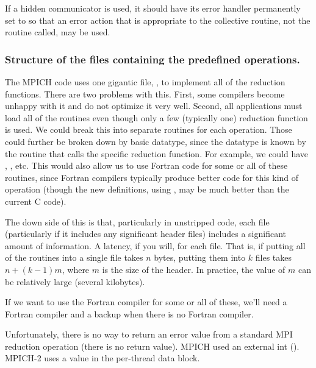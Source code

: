 \documentclass{article}
\begin{document}
If a hidden communicator is used, it should have its error handler permanently
set to  so that an error action that is
appropriate to 
the collective routine, not the routine called, may be used.

\subsubsection{Structure of the files containing the predefined operations.}

The MPICH code uses one gigantic file, , to implement
all of the reduction functions.  There are two problems with this.
First, some compilers become unhappy with it and do not optimize it
very well.  Second, all applications must load all of the routines
even though only a few (typically one) reduction function is used.  We
could break this into separate routines for each operation.  Those
could further be broken down by basic datatype, since the datatype is
known by the routine that calls the specific reduction function.  
For example, we could have ,
, etc.  This would also allow us to use Fortran
code for some or all of these routines, since Fortran compilers
typically produce better code for this kind of operation (though the
new definitions, using , may be much better than the
current C code).

The down side of this is that, particularly in unstripped code, each
file (particularly if it includes any significant header files)
includes a significant amount of information.  A latency, if you will,
for each file.  That is, if putting all of the routines into a single
file takes $n$ bytes, putting them into $k$ files takes $n + (k-1)m$,
where $m$ is the size of the header.  In practice, the value of $m$ can be
relatively large (several kilobytes).

If we want to use the Fortran compiler for some or all of these, we'll
need a Fortran compiler and a backup when there is no Fortran compiler.

Unfortunately, there is no way to return an error value from a standard MPI
reduction operation (there is no return value).  MPICH used an external int
().  MPICH-2 uses a value in the per-thread data block. 

\end{document}
